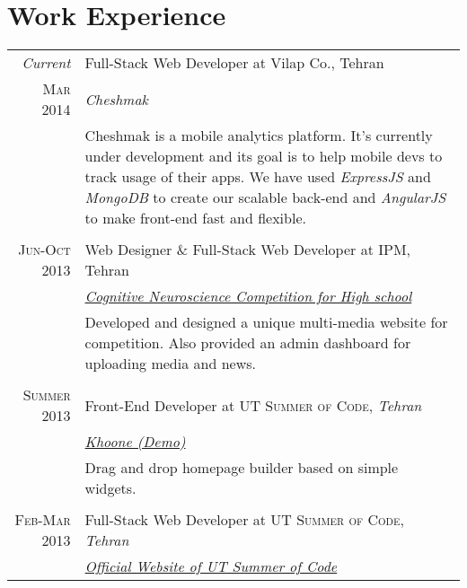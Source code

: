 \documentclass[a4paper,10pt]{article}
\begin{document}
\section{Work Experience}
\begin{tabular}{r|p{11cm}}
 \emph{Current} & Full-Stack Web Developer at Vilap Co., Tehran \\\textsc{Mar 2014}&\emph{Cheshmak}\\&\footnotesize{Cheshmak is a mobile analytics platform. It's currently under development and its goal is to help mobile devs to track usage of their apps. We have used \textit{ExpressJS} and \textit{MongoDB} to create our scalable back-end and \textit{AngularJS} to make front-end fast and flexible.}\\\multicolumn{2}{c}{} \\
 \textsc{Jun-Oct 2013} & Web Designer \& Full-Stack Web Developer at \textsc{IPM}, Tehran \\&\emph{\href{http://cnch.ir}{Cognitive Neuroscience Competition for High school}}\\&\footnotesize{Developed and designed a unique multi-media website for competition. Also provided an admin dashboard for uploading media and news.}\\\multicolumn{2}{c}{} \\
\textsc{Summer 2013} & Front-End Developer at \textsc{UT Summer of Code}, \emph{Tehran}\\&\emph{\href{http://cod3r.ir/demos/khoone}{Khoone (Demo)}}\\&\footnotesize{Drag and drop homepage builder based on simple widgets.}\\\multicolumn{2}{c}{} \\
\textsc{Feb-Mar 2013} & Full-Stack Web Developer at \textsc{UT Summer of Code}, \emph{Tehran}\\&\emph{\href{http://summerofcode.ir}{Official Website of UT Summer of Code}}
\end{tabular}

\end{document}

